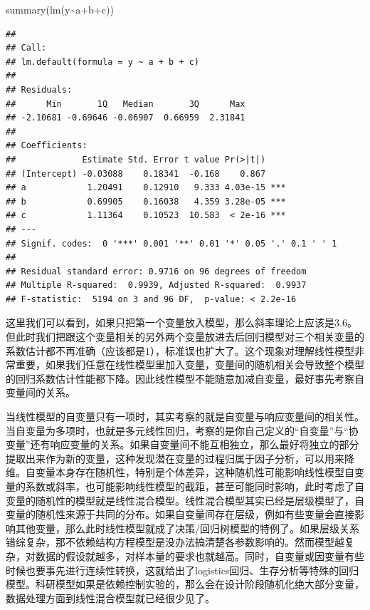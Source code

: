 \documentclass[]{tufte-book}
\newenvironment{Shaded}{}{}
\newcommand{\FunctionTok}[1]{\textcolor[rgb]{0.02,0.16,0.49}{#1}}
\newcommand{\NormalTok}[1]{#1}
\newcommand{\SpecialCharTok}[1]{\textcolor[rgb]{0.25,0.44,0.63}{#1}}
\begin{document}
\begin{Shaded}
\begin{Highlighting}[]
\FunctionTok{summary}\NormalTok{(}\FunctionTok{lm}\NormalTok{(y}\SpecialCharTok{\textasciitilde{}}\NormalTok{a}\SpecialCharTok{+}\NormalTok{b}\SpecialCharTok{+}\NormalTok{c))}
\end{Highlighting}
\end{Shaded}

\begin{verbatim}
## 
## Call:
## lm.default(formula = y ~ a + b + c)
## 
## Residuals:
##      Min       1Q   Median       3Q      Max 
## -2.10681 -0.69646 -0.06907  0.66959  2.31841 
## 
## Coefficients:
##             Estimate Std. Error t value Pr(>|t|)    
## (Intercept) -0.03088    0.18341  -0.168    0.867    
## a            1.20491    0.12910   9.333 4.03e-15 ***
## b            0.69905    0.16038   4.359 3.28e-05 ***
## c            1.11364    0.10523  10.583  < 2e-16 ***
## ---
## Signif. codes:  0 '***' 0.001 '**' 0.01 '*' 0.05 '.' 0.1 ' ' 1
## 
## Residual standard error: 0.9716 on 96 degrees of freedom
## Multiple R-squared:  0.9939, Adjusted R-squared:  0.9937 
## F-statistic:  5194 on 3 and 96 DF,  p-value: < 2.2e-16
\end{verbatim}

这里我们可以看到，如果只把第一个变量放入模型，那么斜率理论上应该是3.6。但此时我们把跟这个变量相关的另外两个变量放进去后回归模型对三个相关变量的系数估计都不再准确（应该都是1），标准误也扩大了。这个现象对理解线性模型非常重要，如果我们任意在线性模型里加入变量，变量间的随机相关会导致整个模型的回归系数估计性能都下降。因此线性模型不能随意加减自变量，最好事先考察自变量间的关系。

当线性模型的自变量只有一项时，其实考察的就是自变量与响应变量间的相关性。当自变量为多项时，也就是多元线性回归，考察的是你自己定义的``自变量''与``协变量''还有响应变量的关系。如果自变量间不能互相独立，那么最好将独立的部分提取出来作为新的变量，这种发现潜在变量的过程归属于因子分析，可以用来降维。自变量本身存在随机性，特别是个体差异，这种随机性可能影响线性模型自变量的系数或斜率，也可能影响线性模型的截距，甚至可能同时影响，此时考虑了自变量的随机性的模型就是线性混合模型。线性混合模型其实已经是层级模型了，自变量的随机性来源于共同的分布。如果自变量间存在层级，例如有些变量会直接影响其他变量，那么此时线性模型就成了决策/回归树模型的特例了。如果层级关系错综复杂，那不依赖结构方程模型是没办法搞清楚各参数影响的。然而模型越复杂，对数据的假设就越多，对样本量的要求也就越高。同时，自变量或因变量有些时候也要事先进行连续性转换，这就给出了logistics回归、生存分析等特殊的回归模型。科研模型如果是依赖控制实验的，那么会在设计阶段随机化绝大部分变量，数据处理方面到线性混合模型就已经很少见了。
\end{document}
